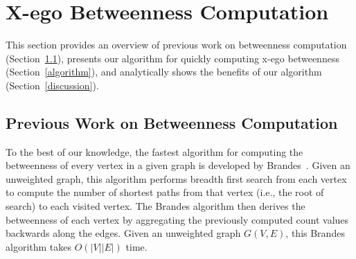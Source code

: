 \section{X-ego Betweenness Computation}\label{computation}

This section provides an overview of previous work on betweenness computation (Section~\ref{brandes}), presents our algorithm for quickly computing x-ego betweenness (Section~\ref{algorithm}), and analytically shows the benefits of our algorithm (Section~\ref{discussion}).

\subsection{Previous Work on Betweenness Computation}\label{brandes}
To the best of our knowledge, the fastest algorithm for computing the betweenness of every vertex in a given graph is developed by Brandes~\cite{Brandes01afaster}.
Given an unweighted graph, this algorithm performs breadth first search from each vertex to compute the number of shortest paths from that vertex (i.e., the root of search) to each visited vertex.
The Brandes algorithm then derives the betweenness of each vertex by aggregating the previously computed count values backwards along the edges.
Given an unweighted graph $G(V, E)$, this Brandes algorithm takes $O(|V| |E|)$ time.

